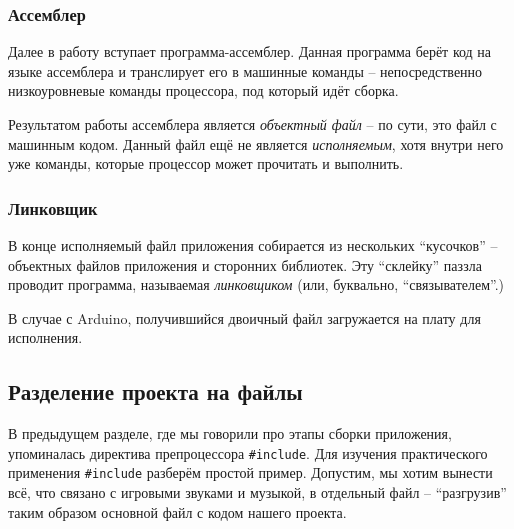 \documentclass[../sparc.tex]{subfiles}
\begin{document}
\subsubsection{Ассемблер}

Далее в работу вступает программа-ассемблер.  Данная программа берёт код на
языке ассемблера и транслирует его в машинные команды -- непосредственно
низкоуровневые команды процессора, под который идёт сборка.

Результатом работы ассемблера является \emph{объектный файл} -- по сути, это файл
с машинным кодом.  Данный файл ещё не является \emph{исполняемым}, хотя внутри
него уже команды, которые процессор может прочитать и выполнить.

\subsubsection{Линковщик}

В конце исполняемый файл приложения собирается из нескольких ``кусочков'' --
объектных файлов приложения и сторонних библиотек.  Эту ``склейку'' паззла
проводит программа, называемая \emph{линковщиком} (или, буквально,
``связывателем''.)

В случае с Arduino, получившийся двоичный файл загружается на плату для
исполнения.

\subsection{Разделение проекта на файлы}
\label{subsection:multi-file-applications}

В предыдущем разделе, где мы говорили про этапы сборки приложения, упоминалась
директива препроцессора \texttt{#include}.  Для изучения практического
применения \texttt{#include} разберём простой пример.  Допустим, мы
хотим вынести всё, что связано с игровыми звуками и музыкой, в отдельный файл --
``разгрузив'' таким образом основной файл с кодом нашего проекта.
\end{document}
